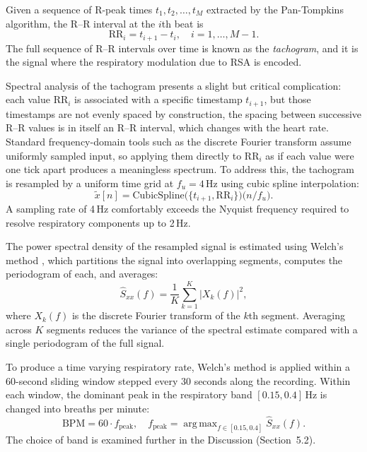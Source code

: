 \documentclass[11pt,a4paper]{article}
\begin{document}
Given a sequence of R-peak times $t_1, t_2, \ldots, t_M$ extracted by the Pan-Tompkins algorithm, the R--R interval at the $i$th beat is
\begin{equation}
    \mathrm{RR}_i = t_{i+1} - t_i, \quad i = 1, \ldots, M-1.
\end{equation}
The full sequence of R--R intervals over time is known as the \textit{tachogram}, and it is the signal where the respiratory modulation due to RSA is encoded.

Spectral analysis of the tachogram presents a slight but critical complication: each value $\mathrm{RR}_i$ is associated with a specific timestamp $t_{i+1}$, but those timestamps are not evenly spaced by construction, the spacing between successive R--R values is in itself an R--R interval, which changes with the heart rate. Standard frequency-domain tools such as the discrete Fourier transform assume uniformly sampled input, so applying them directly to $\mathrm{RR}_i$ as if each value were one tick apart produces a meaningless spectrum. To address this, the tachogram is resampled by a uniform time grid at $f_u = 4$\,Hz using cubic spline interpolation:
\begin{equation}
    \tilde{x}[n] = \mathrm{CubicSpline}\bigl(\{t_{i+1}, \mathrm{RR}_i\}\bigr) \bigl(n / f_u\bigr).
\end{equation}
A sampling rate of 4\,Hz comfortably exceeds the Nyquist frequency required to resolve respiratory components up to 2\,Hz.

The power spectral density of the resampled signal is estimated using Welch's method \cite{welch1967use}, which partitions the signal into overlapping segments, computes the periodogram of each, and averages:
\begin{equation}
    \hat{S}_{xx}(f) = \frac{1}{K} \sum_{k=1}^{K} \left| X_k(f) \right|^2,
\end{equation}
where $X_k(f)$ is the discrete Fourier transform of the $k$th segment. Averaging across $K$ segments reduces the variance of the spectral estimate compared with a single periodogram of the full signal.

To produce a time varying respiratory rate, Welch's method is applied within a 60-second sliding window stepped every 30 seconds along the recording. Within each window, the dominant peak in the respiratory band $[0.15, 0.4]$\,Hz is changed into breaths per minute:
\begin{equation}
    \mathrm{BPM} = 60 \cdot f_{\mathrm{peak}}, \quad f_{\mathrm{peak}} = \mathop{\mathrm{arg\,max}}_{f \in [0.15, 0.4]} \hat{S}_{xx}(f).
\end{equation}
The choice of band is examined further in the Discussion (Section~5.2).
\end{document}
